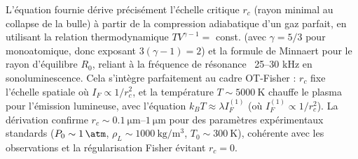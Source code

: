 \documentclass[a4paper,12pt]{article}
\begin{document}
L'équation fournie dérive précisément l'échelle critique \( r_c \) (rayon minimal au collapse de la bulle) à partir de la compression adiabatique d'un gaz parfait, en utilisant la relation thermodynamique \( T V^{\gamma - 1} = \) const. (avec \( \gamma = 5 / 3 \) pour monoatomique, donc exposant \( 3(\gamma - 1) = 2 \)) et la formule de Minnaert pour le rayon d'équilibre \( R_0 \), reliant à la fréquence de résonance ~25–30 kHz en sonoluminescence. Cela s'intègre parfaitement au cadre OT-Fisher : \( r_c \) fixe l'échelle spatiale où \( I_F \propto 1 / r_c^2 \), et la température \( T \sim \SI{5000}{\kelvin} \) chauffe le plasma pour l'émission lumineuse, avec l'équation \( k_B T \approx \lambda I_F^{(1)} \) (où \( I_F^{(1)} \propto 1 / r_c^2 \)). La dérivation confirme \( r_c \sim \SIrange{0.1}{1}{\micro\meter} \) pour des paramètres expérimentaux standards (\( P_0 \sim \SI{1}{\atm} \), \( \rho_L \sim \SI{1000}{\kilogram\per\meter\cubed} \), \( T_0 \sim \SI{300}{\kelvin} \)), cohérente avec les observations et la régularisation Fisher évitant \( r_c = 0 \).
\end{document}
